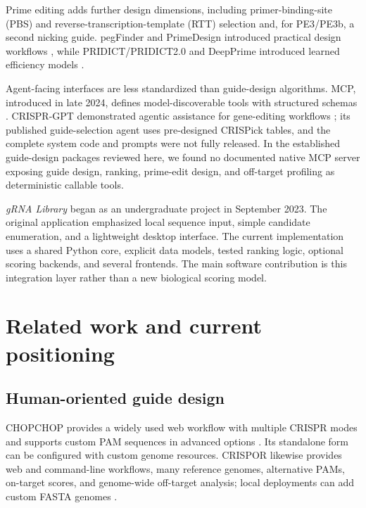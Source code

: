 \documentclass[11pt]{article}
\newcommand{\grnalib}{\textit{gRNA Library}}
\begin{document}
Prime editing adds further design dimensions, including primer-binding-site (PBS) and reverse-transcription-template (RTT) selection and, for PE3/PE3b, a second nicking guide. pegFinder and PrimeDesign introduced practical design workflows \citep{chow2021pegfinder,hsu2021primedesign}, while PRIDICT/PRIDICT2.0 and DeepPrime introduced learned efficiency models \citep{mathis2023pridict,mathis2025pridict2,yu2023deepprime}.

Agent-facing interfaces are less standardized than guide-design algorithms. MCP, introduced in late 2024, defines model-discoverable tools with structured schemas \citep{anthropic2024mcp,mcp2026tools}. CRISPR-GPT demonstrated agentic assistance for gene-editing workflows \citep{qu2026crisprgpt}; its published guide-selection agent uses pre-designed CRISPick tables, and the complete system code and prompts were not fully released. In the established guide-design packages reviewed here, we found no documented native MCP server exposing guide design, ranking, prime-edit design, and off-target profiling as deterministic callable tools.

\grnalib{} began as an undergraduate project in September 2023. The original application emphasized local sequence input, simple candidate enumeration, and a lightweight desktop interface. The current implementation uses a shared Python core, explicit data models, tested ranking logic, optional scoring backends, and several frontends. The main software contribution is this integration layer rather than a new biological scoring model.

\section{Related work and current positioning}

\subsection{Human-oriented guide design}

CHOPCHOP provides a widely used web workflow with multiple CRISPR modes and supports custom PAM sequences in advanced options \citep{labun2019chopchop,chopchopInstructions}. Its standalone form can be configured with custom genome resources. CRISPOR likewise provides web and command-line workflows, many reference genomes, alternative PAMs, on-target scores, and genome-wide off-target analysis; local deployments can add custom FASTA genomes \citep{concordet2018crispor,crisporManual}.
\end{document}
